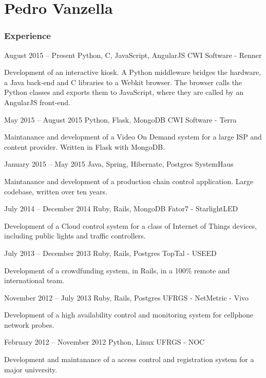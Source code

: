 \documentclass{tccv}
\begin{document}
\part{Pedro Vanzella}

\section{Experience}

\begin{eventlist}

\item{August 2015 -- Present}
     {Python, C, JavaScript, AngularJS}
     {CWI Software - Renner}
     
Development of an interactive kiosk. A Python middleware bridges the hardware, a
Java back-end and C libraries to a Webkit browser. The browser calls the Python
classes and exports them to JavaScript, where they are called by an AngularJS front-end.

\item{May 2015 -- August 2015}
     {Python, Flask, MongoDB}
     {CWI Software - Terra}

Maintanance and development of a Video On Demand system for a large ISP and
content provider. Written in Flask with MongoDB.

\item{January 2015 -- May 2015}
     {Java, Spring, Hibernate, Postgres}
     {SystemHaus}

Maintanance and development of a production chain control application. Large
codebase, written over ten years.

\item{July 2014 -- December 2014}
     {Ruby, Rails, MongoDB}
     {Fator7 - StarlightLED}

Development of a Cloud control system for a class of Internet of Things devices,
including public lights and traffic controllers.

\item{July 2013 -- December 2013}
     {Ruby, Rails, Postgres}
     {TopTal - USEED}

Development of a crowdfunding system, in Rails, in a 100\% remote and
international team.

\item{November 2012 -- July 2013}
     {Ruby, Rails, Postgres}
     {UFRGS - NetMetric - Vivo}
 
Development of a high availability control and monitoring system for cellphone
network probes.

\item{February 2012 -- November 2012}
     {Python, Linux}
     {UFRGS - NOC}

Development and maintanance of a access control and registration system for a
major university.

\end{eventlist}
\end{document}
